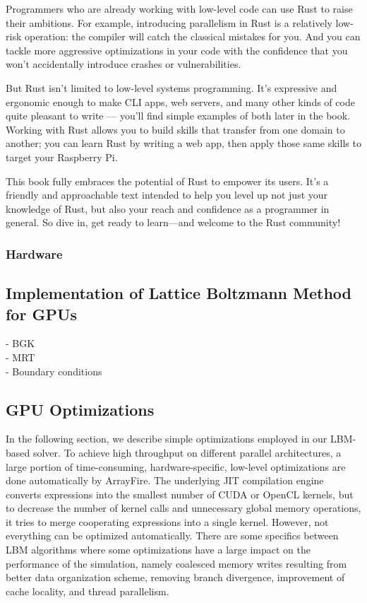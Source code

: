 Programmers who are already working with low-level code can use Rust to raise their ambitions. For example, introducing parallelism in Rust is a relatively low-risk operation: the compiler will catch the classical mistakes for you. And you can tackle more aggressive optimizations in your code with the confidence that you won’t accidentally introduce crashes or vulnerabilities.

But Rust isn’t limited to low-level systems programming. It’s expressive and ergonomic enough to make CLI apps, web servers, and many other kinds of code quite pleasant to write — you’ll find simple examples of both later in the book. Working with Rust allows you to build skills that transfer from one domain to another; you can learn Rust by writing a web app, then apply those same skills to target your Raspberry Pi.

This book fully embraces the potential of Rust to empower its users. It’s a friendly and approachable text intended to help you level up not just your knowledge of Rust, but also your reach and confidence as a programmer in general. So dive in, get ready to learn—and welcome to the Rust community!

\cite{steveklabnik2018}

\subsubsection{Hardware}


\subsection{Implementation of Lattice Boltzmann Method for GPUs}

- BGK \\
- MRT \\
- Boundary conditions

\subsection{GPU Optimizations}
\label{optimizations-for-gpu}

In the following section, we describe simple optimizations employed in our LBM-based solver. To achieve high throughput on different parallel architectures, a large portion of time-consuming, hardware-specific, low-level optimizations are done automatically by ArrayFire. The underlying JIT compilation engine converts expressions into the smallest number of CUDA or OpenCL kernels, but to decrease the number of kernel calls and unnecessary global memory operations, it tries to merge cooperating expressions into a single kernel. However, not everything can be optimized automatically. There are some specifics between LBM algorithms where some optimizations have a large impact on the performance of the simulation, namely coalesced memory writes resulting from better data organization scheme, removing branch divergence, improvement of cache locality, and thread parallelism.

